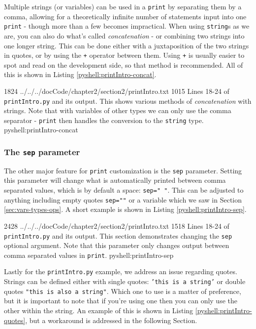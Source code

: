 \documentclass[oneside]{book}
\begin{document}
Multiple strings (or variables) can be used in a \texttt{print} by separating them by a comma, allowing for a theoretically infinite number of statements input into one \texttt{print} - though more than a few becomes impractical. When using \texttt{string}s as we are, you can also do what's called \emph{concatenation} - or combining two strings into one longer string. This can be done either with a juxtaposition of the two strings in quotes, or by using the \texttt{+} operator between them. Using \texttt{+} is usually easier to spot and read on the development side, so that method is recommended. All of this is shown in Listing \ref{pyshell:printIntro-concat}.

{18}{24}
{../../../docCode/chapter2/section2/printIntro.txt}
{10}{15}
{Lines 18-24 of \texttt{printIntro.py} and its output. This shows various methods of \textit{concatenation} with strings. Note that with variables of other types we can only use the comma separator - \texttt{print} then handles the conversion to the \texttt{string} type.}
{pyshell:printIntro-concat}

\subsubsection{The \texttt{sep} parameter}\label{sec:printSep}

The other major feature for \texttt{print} customization is the \texttt{sep} parameter. Setting this parameter will change what is automatically printed between comma separated values, which is by default a space: \texttt{sep=" "}. This can be adjusted to anything including empty quotes \texttt{sep=""} or a variable which we saw in Section \ref{sec:vars-types-ops}. A short example is shown in Listing \ref{pyshell:printIntro-sep}.

{24}{28}
{../../../docCode/chapter2/section2/printIntro.txt}
{15}{18}
{Lines 18-24 of \texttt{printIntro.py} and its output. This section demonstrates changing the \texttt{sep} optional argument. Note that this parameter only changes output between comma separated values in \texttt{print}.}
{pyshell:printIntro-sep}

Lastly for the \texttt{printIntro.py} example, we address an issue regarding quotes. Strings can be defined either with single quotes: \texttt{'this is a string'} or double quotes \texttt{"this is also a string"}. Which one to use is a matter of preference, but it is important to note that if you're using one then you can only use the other within the string. An example of this is shown in Listing \ref{pyshell:printIntro-quotes}, but a workaround is addressed in the following Section.
        
\end{document}
